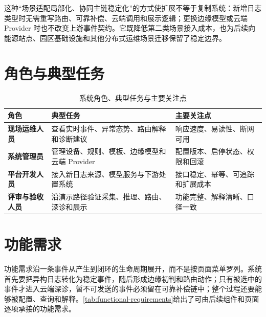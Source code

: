 这种“场景适配局部化、协同主链稳定化”的方式使扩展不等于复制系统：新增日志类型时无需重写路由、可靠补偿、云端调用和展示逻辑；更换边缘模型或云端 Provider 时也不改变上游事件契约。它既降低第二类场景接入成本，也为后续向能源站点、园区基础设施和其他分布式运维场景迁移保留了稳定边界。

\section{角色与典型任务}
\begin{table}[htbp]
  \centering
  \small
  \caption{系统角色、典型任务与主要关注点}
  \label{tab:roles-v03}
  \begin{tabularx}{\textwidth}{>{\bfseries}p{} X X}
    \toprule
    角色 & 典型任务 & 主要关注点 \\
    \midrule
    现场运维人员 & 查看实时事件、异常态势、路由解释和诊断建议 & 响应速度、易读性、断网可用 \\
    系统管理员 & 管理设备、规则、模板、边缘模型和云端 Provider & 配置版本、启停状态、权限和回滚 \\
    平台开发人员 & 接入新日志来源、模型服务与下游处置系统 & 接口稳定、幂等、可追踪和扩展成本 \\
    评审与验收人员 & 沿演示路径验证采集、推理、路由、深诊和展示 & 功能完整、解释清晰、口径一致 \\
    \bottomrule
  \end{tabularx}
\end{table}

\section{功能需求}

功能需求沿一条事件从产生到闭环的生命周期展开，而不是按页面菜单罗列。系统首先要把异构日志转化为稳定事件，随后形成边缘初判和路由动作；只有被选中的事件才进入云端深诊，暂不可发送的事件必须留在可靠补偿链中；整个过程还要能够被配置、查询和解释。\cref{tab:functional-requirements}给出了可由后续组件和页面逐项承接的功能需求。

